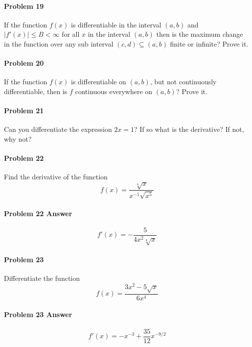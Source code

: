 \documentclass[a4paper, 11pt]{article}
\begin{document}
\paragraph{Problem 19}
If the function $f(x)$ is differentiable in the interval $(a,b)$ and $|f'(x)| \leq B < \infty$ for all $x$ in the interval $(a,b)$ then is the maximum change in the function over any sub interval $(c,d) \subseteq (a,b)$ finite or infinite? Prove it.

\paragraph{Problem 20}
If the function $f(x)$ is differentiable on $(a,b)$, but not continuously differentiable, then is $f$ continuous everywhere on $(a,b)$? Prove it.

\paragraph{Problem 21}
Can you differentiate the expression $2x = 1$? If so what is the derivative?  If not, why not?

\paragraph{Problem 22} Find the derivative of the function
\[
	f(x) = \frac{\sqrt[4]{x}}{x^{-1} \sqrt{x^5}}
\]


\paragraph{Problem 22 Answer}
\[
	f'(x) = - \frac{5}{4x^2 \sqrt[4]{x} }
\]


\paragraph{Problem 23} Differentiate the function
\[
	f(x) = \frac{3x^2 - 5\sqrt{x} }{ 6x^4 }
\]


\paragraph{Problem 23 Answer}
\[
	f'(x) = -x^{-3} + \frac{35}{12} x^{-9/2}
\]
\end{document}
